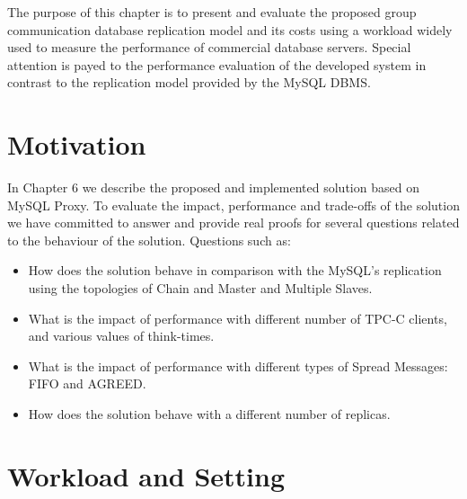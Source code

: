 

The purpose of this chapter is to present and evaluate the proposed group communication database replication model and its costs using a workload widely used to measure the performance of commercial database servers.
Special attention is payed to the performance evaluation of the developed system in contrast to the replication model provided by the MySQL DBMS. 

\section{Motivation}

In Chapter 6 we describe the proposed and implemented solution based on MySQL Proxy. To evaluate the impact, performance and trade-offs of the solution we have committed to answer and provide real proofs for several questions related to the behaviour of the solution. Questions such as:

\begin{itemize}
	\item How does the solution behave in comparison with the MySQL's replication using the topologies of Chain and Master and Multiple Slaves.
	\item What is the impact of performance with different number of TPC-C clients, and various values of think-times.
	\item What is the impact of performance with different types of Spread Messages: FIFO and AGREED.
	\item How does the solution behave with a different number of replicas.
\end{itemize}	

\section{Workload and Setting}

